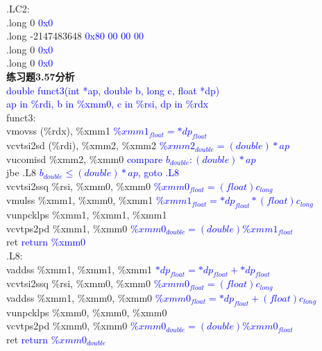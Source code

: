 \documentclass{article}
\newcommand{\blue}[1]{\textcolor{blue}{#1}}
\begin{document}
\begin{CJK}{UTF8}{gbsn}
.LC2:	\\
	\hspace*{1em}.long	0 \blue{0x0}	\\
	\hspace*{1em}.long	-2147483648 \blue{0x80 00 00 00}	\\
	\hspace*{1em}.long	0 \blue{0x0}	\\
	\hspace*{1em}.long	0 \blue{0x0}	\\[3ex]
\textbf{练习题3.57分析}	\\
\blue{double funct3(int *ap, double b, long c, float *dp)}	\\
\blue{ap in \%rdi, b in \%xmm0, c in \%rsi, dp in \%rdx}	\\
funct3:	\\
	\hspace*{1em}vmovss	(\%rdx), \%xmm1 \blue{$\%xmm1_{float}=*dp_{float}$}	\\
	\hspace*{1em}vcvtsi2sd	(\%rdi), \%xmm2, \%xmm2 \blue{$\%xmm2_{double}=(double)*ap$}	\\
	\hspace*{1em}vucomisd	\%xmm2, \%xmm0 \blue{compare $b_{double}:(double)*ap$}	\\
	\hspace*{1em}jbe	.L8 \blue{$b_{double}\le(double)*ap$, goto .L8}	\\
	\hspace*{1em}vcvtsi2ssq	\%rsi, \%xmm0, \%xmm0 \blue{$\%xmm0_{float}=(float)c_{long}$}	\\
	\hspace*{1em}vmulss	\%xmm1, \%xmm0, \%xmm1 \blue{$\%xmm1_{float}=*dp_{float}*(float)c_{long}$}	\\
	\hspace*{1em}vunpcklps	\%xmm1, \%xmm1, \%xmm1 \blue{}	\\
	\hspace*{1em}vcvtps2pd	\%xmm1, \%xmm0 \blue{$\%xmm0_{double}=(double)\%xmm1_{float}$}	\\
	\hspace*{1em}ret \blue{return \%xmm0}	\\
.L8:	\\
\hspace*{1em}vaddss	\%xmm1, \%xmm1, \%xmm1 \blue{$*dp_{float}=*dp_{float}+*dp_{float}$}	\\
	\hspace*{1em}vcvtsi2ssq	\%rsi, \%xmm0, \%xmm0 \blue{$\%xmm0_{float}=(float)c_{long}$}	\\
	\hspace*{1em}vaddss	\%xmm1, \%xmm0, \%xmm0 \blue{$\%xmm0_{float}=*dp_{float}+(float)c_{long}$}	\\
	\hspace*{1em}vunpcklps	\%xmm0, \%xmm0, \%xmm0 \blue{}	\\
	\hspace*{1em}vcvtps2pd	\%xmm0, \%xmm0 \blue{$\%xmm0_{double}=(double)\%xmm0_{float}$}	\\
	\hspace*{1em}ret \blue{return $\%xmm0_{double}$}	\\



\end{CJK}
\end{document}
